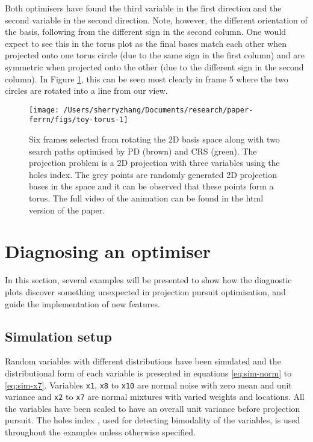 Both optimisers have found the third variable in the first direction and
the second variable in the second direction. Note, however, the
different orientation of the basis, following from the different sign in
the second column. One would expect to see this in the torus plot as the
final bases match each other when projected onto one torus circle (due
to the same sign in the first column) and are symmetric when projected
onto the other (due to the different sign in the second column). In
Figure \ref{fig:toy-torus}, this can be seen most clearly in frame 5
where the two circles are rotated into a line from our view.

\begin{Schunk}
\begin{figure}

{\centering \texttt{[image: /Users/sherryzhang/Documents/research/paper-ferrn/figs/toy-torus-1]} 

}

\caption[Six frames selected from rotating the 2D basis space along with two search paths optimised by PD (brown) and CRS (green)]{Six frames selected from rotating the 2D basis space along with two search paths optimised by PD (brown) and CRS (green). The projection problem is a 2D projection with three variables using the holes index. The grey points are randomly generated 2D projection bases in the space and it can be observed that these points form a torus. The full video of the animation can be found in the html version of the paper.}\label{fig:toy-torus}
\end{figure}
\end{Schunk}

\hypertarget{application}{%
\section{Diagnosing an optimiser}\label{application}}

In this section, several examples will be presented to show how the
diagnostic plots discover something unexpected in projection pursuit
optimisation, and guide the implementation of new features.

\hypertarget{simulation-setup}{%
\subsection{Simulation setup}\label{simulation-setup}}

Random variables with different distributions have been simulated and
the distributional form of each variable is presented in equations
\ref{eq:sim-norm} to \ref{eq:sim-x7}. Variables \texttt{x1}, \texttt{x8}
to \texttt{x10} are normal noise with zero mean and unit variance and
\texttt{x2} to \texttt{x7} are normal mixtures with varied weights and
locations. All the variables have been scaled to have an overall unit
variance before projection pursuit. The holes index
\citep{cook2008grand}, used for detecting bimodality of the variables,
is used throughout the examples unless otherwise specified.

